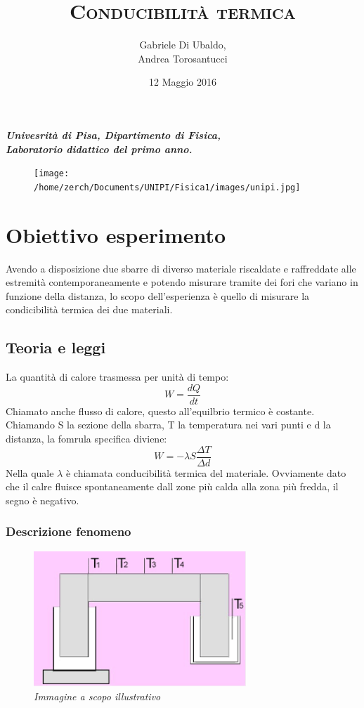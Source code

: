 \documentclass[a4paper,10pt]{article}
\begin{document}
\title{\textsc{Conducibilità termica}}
\author{Gabriele Di Ubaldo,\\ Andrea Torosantucci}
\date{12 Maggio 2016}
\maketitle
\begin{center}
\textit{\textbf{Univesrità di Pisa, Dipartimento di Fisica, \\ Laboratorio didattico del primo anno.}} \\
\end{center}
\begin{figure}[H]
 \centering 
 \texttt{[image: /home/zerch/Documents/UNIPI/Fisica1/images/unipi.jpg]}
\end{figure} 
\tableofcontents
\section{Obiettivo esperimento}
Avendo a disposizione due sbarre di diverso materiale riscaldate e raffreddate alle estremità contemporaneamente e potendo misurare tramite dei fori che variano in funzione della distanza,
lo scopo dell'esperienza è quello di misurare la condicibilità termica dei due materiali.
\subsection{Teoria e leggi}
La quantità di calore trasmessa per unità di tempo:
\begin{equation}
 W=\frac{dQ}{dt}
\end{equation}
Chiamato anche flusso di calore, questo all'equilbrio termico è costante. Chiamando S la sezione della sbarra, T la temperatura nei vari punti e d la distanza, la fomrula specifica diviene:
\begin{equation}
 W=-\lambda S\frac{\Delta T}{\Delta d}
\end{equation}
Nella quale $\lambda$ è chiamata conducibilità termica del materiale. Ovviamente dato che il calre fluisce spontaneamente dall zone più calda alla zona più fredda, il segno è negativo.
\subsubsection{Descrizione fenomeno}
\begin{figure}[H]
 \centering
 \includegraphics[width=8cm]{images.png}
 \caption{\textit{Immagine a scopo illustrativo}}
\end{figure}
\end{document}
